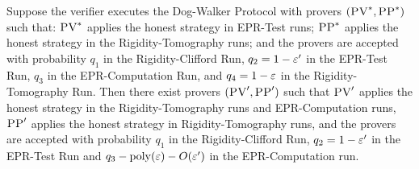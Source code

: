 \begin{lemma}\label{lem:PV-34}
Suppose the verifier executes the Dog-Walker Protocol with provers $(\textsc{PV}^*,\textsc{PP}^*)$ such that: $\textsc{PV}^*$ applies the honest strategy in EPR-Test runs; 
$\textsc{PP}^*$ applies the honest strategy in the Rigidity-Tomography runs; and the provers are accepted with probability $q_1$ in the Rigidity-Clifford Run, $q_2 = 1-\varepsilon'$ in the EPR-Test Run, $q_3$ in the EPR-Computation Run, and $q_4=1-\varepsilon$ in the Rigidity-Tomography Run. Then there exist provers $(\textsc{PV}',\textsc{PP}')$ such that $\textsc{PV}'$ applies the honest strategy in the Rigidity-Tomography runs and EPR-Computation runs, $\textsc{PP}'$ applies the honest strategy in Rigidity-Tomography runs, and
the provers are accepted with probability $q_1$ in the Rigidity-Clifford Run, $q_2 = 1-\varepsilon'$ in the EPR-Test Run and $q_3-\mathrm{poly}(\varepsilon)-O(\varepsilon')$ in the EPR-Computation run. 
\end{lemma}

